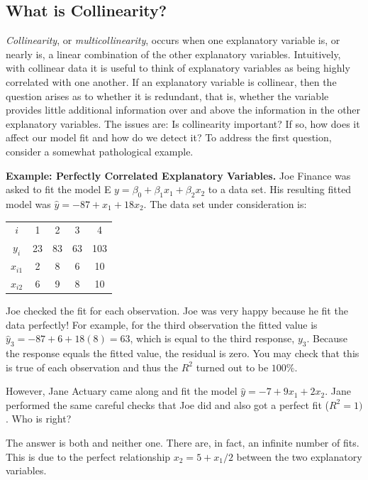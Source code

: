 \subsection{What is Collinearity?}

\textit{Collinearity}, or \textit{multicollinearity}, occurs when
one explanatory variable is, or nearly is, a linear combination of
the other explanatory variables. Intuitively, with collinear data it
is useful to think of explanatory variables as being highly
correlated with one another. If an explanatory variable is
collinear, then the question arises as to whether it is redundant,
that is, whether the variable provides little additional information
over and above the information in the other explanatory variables.
The issues are: Is collinearity important? If so, how does it affect
our model fit and how do we detect it? To address the first
question, consider a somewhat pathological example.

\linejed

\textbf{Example: Perfectly Correlated Explanatory Variables.} Joe
Finance was asked to fit the model E
$y=\beta_0+\beta_1x_1+\beta_2x_2$ to a data set. His resulting
fitted model was $\hat{y}=-87+x_1+18x_2.$  The data set under
consideration is:

\begin{center}
\begin{tabular}{ccccc}
\hline
$i$ & 1 & 2 & 3 & 4 \\
$y_i$ & 23 & 83 & 63 & 103 \\
$x_{i1}$ & 2 & 8 & 6 & 10 \\
$x_{i2}$ & 6 & 9 & 8 & 10 \\ \hline
\end{tabular}%
\end{center}

Joe checked the fit for each observation. Joe was very happy because
he fit the data perfectly! For example, for the third observation
the fitted value is $\hat{y}_3=-87+6+18(8)=63$, which is equal to
the third response, $y_3 $. Because the response equals the fitted
value, the residual is zero. You may check that this is true of each
observation and thus the $R^2$ turned out to be $100\%$.

However, Jane Actuary came along and fit the model
$\hat{y}=-7+9x_1+2x_2.$ Jane performed the same careful checks that
Joe did and also got a perfect fit ($R^2 = 1)$. Who is right?

The answer is both and neither one. There are, in fact, an infinite
number of fits. This is due to the perfect relationship
$x_2=5+x_1/2$ between the two explanatory variables.

